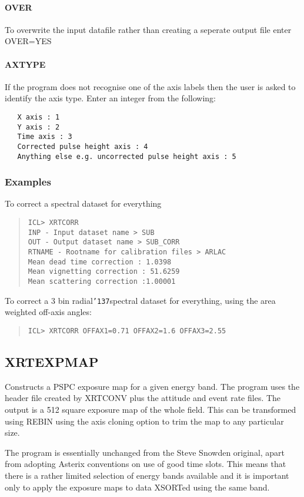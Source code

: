 \documentclass{book}
\renewcommand{\_}{{\tt\char'137}}     %
\begin{document}
\paragraph{OVER}
To overwrite the input datafile rather than creating a seperate
output file enter OVER=YES
\paragraph{AXTYPE}
If the program does not recognise one of the axis labels then the
user is asked to identify the axis type. Enter an integer from the
following:
\begin{verbatim}
   X axis : 1
   Y axis : 2
   Time axis : 3
   Corrected pulse height axis : 4
   Anything else e.g. uncorrected pulse height axis : 5
\end{verbatim}
\subsubsection{Examples}
To correct a spectral dataset for everything
\begin{quote}\begin{verbatim}
ICL> XRTCORR
INP - Input dataset name > SUB
OUT - Output dataset name > SUB_CORR
RTNAME - Rootname for calibration files > ARLAC
Mean dead time correction : 1.0398
Mean vignetting correction : 51.6259
Mean scattering correction :1.00001
\end{verbatim}\end{quote}
To correct a 3 bin radial\_spectral dataset for everything,
using the area weighted off-axis angles:
\begin{quote}\begin{verbatim}
ICL> XRTCORR OFFAX1=0.71 OFFAX2=1.6 OFFAX3=2.55
\end{verbatim}\end{quote}
\subsection{XRTEXPMAP}
Constructs a PSPC exposure map for a given energy band. The program
uses the header file created by XRTCONV plus the attitude and event
rate files. The output is a 512 square exposure map of the whole
field. This can be transformed using REBIN using the axis cloning
option to trim the map to any particular size.

The program is essentially unchanged from the Steve Snowden original,
apart from adopting Asterix conventions on use of good time slots.
This means that there is a rather limited selection of energy bands
available and it is important only to apply the exposure maps to data
XSORTed using the same band.
\end{document}
